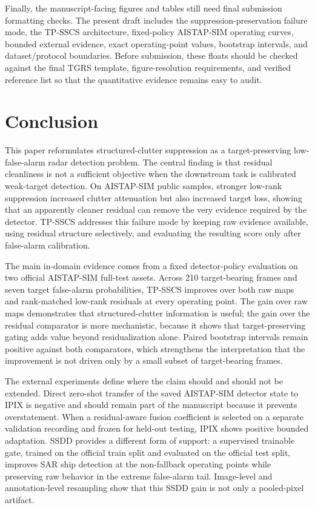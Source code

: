\documentclass[journal]{IEEEtran}
\begin{document}
Finally, the manuscript-facing figures and tables still need final submission formatting checks. The present draft includes the suppression-preservation failure mode, the TP-SSCS architecture, fixed-policy AISTAP-SIM operating curves, bounded external evidence, exact operating-point values, bootstrap intervals, and dataset/protocol boundaries. Before submission, these floats should be checked against the final TGRS template, figure-resolution requirements, and verified reference list so that the quantitative evidence remains easy to audit.

\section{Conclusion}

This paper reformulates structured-clutter suppression as a target-preserving low-false-alarm radar detection problem. The central finding is that residual cleanliness is not a sufficient objective when the downstream task is calibrated weak-target detection. On AISTAP-SIM public samples, stronger low-rank suppression increased clutter attenuation but also increased target loss, showing that an apparently cleaner residual can remove the very evidence required by the detector. TP-SSCS addresses this failure mode by keeping raw evidence available, using residual structure selectively, and evaluating the resulting score only after false-alarm calibration.

The main in-domain evidence comes from a fixed detector-policy evaluation on two official AISTAP-SIM full-test assets. Across 210 target-bearing frames and seven target false-alarm probabilities, TP-SSCS improves over both raw maps and rank-matched low-rank residuals at every operating point. The gain over raw maps demonstrates that structured-clutter information is useful; the gain over the residual comparator is more mechanistic, because it shows that target-preserving gating adds value beyond residualization alone. Paired bootstrap intervals remain positive against both comparators, which strengthens the interpretation that the improvement is not driven only by a small subset of target-bearing frames.

The external experiments define where the claim should and should not be extended. Direct zero-shot transfer of the saved AISTAP-SIM detector state to IPIX is negative and should remain part of the manuscript because it prevents overstatement. When a residual-aware fusion coefficient is selected on a separate validation recording and frozen for held-out testing, IPIX shows positive bounded adaptation. SSDD provides a different form of support: a supervised trainable gate, trained on the official train split and evaluated on the official test split, improves SAR ship detection at the non-fallback operating points while preserving raw behavior in the extreme false-alarm tail. Image-level and annotation-level resampling show that this SSDD gain is not only a pooled-pixel artifact.
\end{document}
